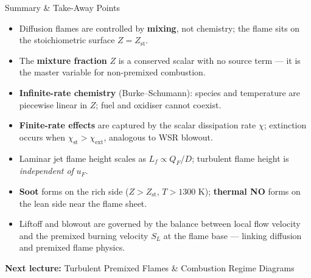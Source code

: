 \documentclass[12pt,aspectratio=169]{beamer}
\newcommand{\Zst}{Z_{\text{st}}}
\newcommand{\chist}{\chi_{\text{st}}}
\newcommand{\chiext}{\chi_{\text{ext}}}
\newcommand{\SL}{S_L}
\newcommand{\Lf}{L_f}
\begin{document}
\begin{frame}{Summary \& Take-Away Points}
  \begin{itemize}
    \item Diffusion flames are controlled by \textbf{mixing}, not
          chemistry; the flame sits on the stoichiometric surface
          $Z = \Zst$.
    \item The \textbf{mixture fraction} $Z$ is a conserved scalar
          with no source term --- it is the master variable for
          non-premixed combustion.
    \item \textbf{Infinite-rate chemistry} (Burke--Schumann): species
          and temperature are piecewise linear in $Z$; fuel and
          oxidiser cannot coexist.
    \item \textbf{Finite-rate effects} are captured by the scalar
          dissipation rate $\chi$; extinction occurs when
          $\chist > \chiext$, analogous to WSR blowout.
    \item Laminar jet flame height scales as $\Lf \propto Q_F/D$;
          turbulent flame height is \emph{independent of} $u_F$.
    \item \textbf{Soot} forms on the rich side ($Z > \Zst$, $T > 1300$ K);
          \textbf{thermal NO} forms on the lean side near the flame sheet.
    \item Liftoff and blowout are governed by the balance between
          local flow velocity and the premixed burning velocity
          $\SL$ at the flame base --- linking diffusion and premixed
          flame physics.
  \end{itemize}
  \vfill
  \begin{center}
    \large\textbf{Next lecture:} Turbulent Premixed Flames
    \& Combustion Regime Diagrams
  \end{center}
\end{frame}
\end{document}

